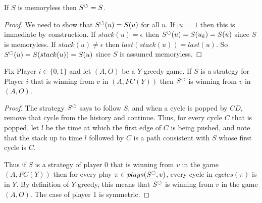 \documentclass[a4paper,10pt]{article}
\begin{document}
\cbend

\begin{lemma}[equal] \label{lem:memless}
If $S$ is memoryless then $S^{\circlearrowleft} = S$.
\end{lemma}
\begin{proof}
We need to show that $S^{\circlearrowleft}(u) = S(u)$ for all $u$. If $|u| = 1$ then this is immediate by construction. If $stack(u) = \epsilon$ then $S^{\circlearrowleft}(u) = S(u_k) = S(u)$ since $S$ is memoryless.
If $stack(u) \neq \epsilon$ then $last(stack(u)) = last(u)$. So $S^{\circlearrowleft}(u) = S(stack(u)) = S(u)$ since $S$ is assumed memoryless.
\end{proof}




\begin{lemma}[pumping]\label{lem:pumping}
Fix Player $i \in \{0,1\}$ and let $(A,O)$ be a $Y$-greedy game. If $S$ is a strategy for Player $i$ that is winning from $v$ in $(A,FC(Y))$ then $S^{\circlearrowleft}$ is winning from $v$ in $(A,O)$.
\end{lemma}

\begin{proof}
The strategy $S^{\circlearrowleft}$ says to follow $S$, and when a cycle is popped by $CD$, remove that cycle from the history and continue. Thus, for every cycle $C$ that is popped, let $l$ be the time at which the first edge of $C$ is being pushed, and note that the stack up to time $l$ followed by $C$ is a path consistent with $S$ whose first cycle is $C$.

Thus if $S$ is a strategy of player $0$ that is winning from $v$ in the game $(A,FC(Y))$ then for every play $\pi \in plays(S^{\circlearrowleft},v)$, every cycle in $cycles(\pi)$ is in $Y$. By definition of $Y$-greedy, this means that $S^{\circlearrowleft}$ is winning from $v$ in the game $(A,O)$. The case of player $1$ is symmetric.
\end{proof}
\end{document}
